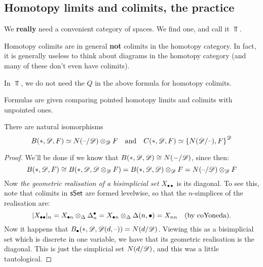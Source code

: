 \documentclass[11pt]{article}
\begin{document}
\begin{7. Homotopy limits and colimits, the practice}
\section*{Homotopy limits and colimits, the practice}
\begin{itemise}
\setlength{\parindent}{.25in}
\item We \textbf{really} need a convenient category of spaces. We find one, and call it $\Top$.
\item Homotopy colimits are in general \textbf{not} colimits in the homotopy category. In fact, it is generally useless to think about diagrams in the homotopy category (and many of these don't even have colimits).
\item In $\Top$, we do not need the $Q$ in the above formula for homotopy colimits. 
\item Formulas are given comparing pointed homotopy limits and colimits with unpointed ones.
\end{itemise}
\begin{thm*}[7.40]
There are natural isomorphisms
\[B(*,\mathscr{D},F)\simeq N(\textup{--} /\mathscr{D})\otimes_{\mathscr{D}} F\quad \textup{and}\quad C(*,\mathscr{D},F)\simeq \left\{N(\mathscr{D}/\textup{--}),F\right\}^{\mathscr{D}}\]
\end{thm*}
\begin{proof}We'll be done if we know that $B(*,\mathscr{D},\mathscr{D})\cong N(-/\mathscr{D})$, since then:
\[B(*,\mathscr{D},F)\cong B(*,\mathscr{D},\mathscr{D}\otimes _{\mathscr{D}} F)=B(*,\mathscr{D},\mathscr{D})\otimes _{\mathscr{D}} F=N(\textup{--} /\mathscr{D})\otimes_{\mathscr{D}} F\]
Now \emph{the geometric realisation of a bisimplicial set} $X_{\bullet \bullet }$ is its diagonal. To see this, note that colimits in $\operatorname{{\mathsf{sSet}}}$ are formed levelwise, so that the $n$-simplices of the realisation are:
\[|X_{\bullet \bullet }|_n=X_{\bullet n}\otimes _\Delta \Delta^\bullet _n=X_{\bullet n}\otimes _\Delta \Delta(n,\bullet )=X_{nn} \textup{\quad (by coYoneda).}\]
Now it happens that $B_\bullet (*,\mathscr{D},\mathscr{D}(d,\textup{--} ))=N(d/\mathscr{D})$. Viewing this as a bisimplicial set which is discrete in one variable, we have that its geometric realisation is the diagonal. This is just the simplicial set $N(d/\mathscr{D})$, and this was a little tautological.
\end{proof}
\end{7. Homotopy limits and colimits, the practice}
\end{document}
